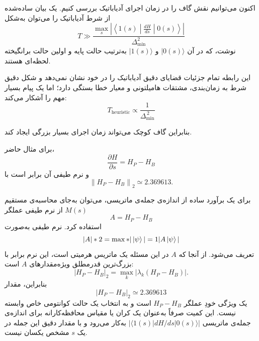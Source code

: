 اکنون می‌توانیم نقش گاف را در زمان اجرای آدیاباتیک بررسی کنیم. یک بیان ساده‌شده از شرط آدیاباتیک را می‌توان به‌شکل
\begin{equation}
	\label{eq:adiabatic-condition-example}
	T
	\gg
	\frac{
		\displaystyle
		\max_s
		\left|
		\left\langle
		1(s)
		\middle|
		\frac{dH}{ds}
		\middle|
		0(s)
		\right\rangle
		\right|
	}{
		\Delta_{\min}^2
	}
\end{equation}
نوشت، که در آن $\lvert0(s)\rangle$ و $\lvert1(s)\rangle$ به‌ترتیب حالت پایه و اولین حالت برانگیخته لحظه‌ای هستند.

این رابطه تمام جزئیات قضایای دقیق آدیاباتیک را در خود نشان نمی‌دهد و شکل دقیق شرط به زمان‌بندی، مشتقات هامیلتونی و معیار خطا بستگی دارد؛ اما یک پیام بسیار مهم را آشکار می‌کند:
\begin{equation}
	\boxed{
		T_{\mathrm{heuristic}}\propto\frac{1}{\Delta_{\min}^{\,2}}
	}
\end{equation}


بنابراین گاف کوچک می‌تواند زمان اجرای بسیار بزرگی ایجاد کند.

برای مثال حاضر،
\begin{equation}
	\frac{\partial H}{\partial s}=H_P-H_B
\end{equation}
و نرم طیفی آن برابر است با
\begin{equation}
	\label{eq:norm-example}
	\left\|H_P-H_B\right\|_2
	\simeq2.369613.
\end{equation}

برای یک برآورد ساده از اندازه‌ی جمله‌ی ماتریسی، می‌توان به‌جای محاسبه‌ی مستقیم $M(s)$ از نرم طیفی عملگر
\begin{equation}
	A=H_P-H_B
\end{equation}
استفاده کرد. نرم طیفی به‌صورت
\begin{equation}
	|A|*2
	=
	\max*{|\ket{\psi}|=1}
	|A\ket{\psi}|
\end{equation}
تعریف می‌شود. از آنجا که $A$ در این مسئله یک ماتریس هرمیتی است، این نرم برابر با بزرگ‌ترین قدرمطلق ویژه‌مقدارهای $A$ است:
\begin{equation}
	|H_P-H_B|_2
	=
	\max_k
	\left|\lambda_k(H_P-H_B)\right|.
\end{equation}
بنابراین، مقدار
\begin{equation}
	|H_P-H_B|_2\simeq2.369613
\end{equation}
یک ویژگی خودِ عملگر $H_P-H_B$ است و به انتخاب یک حالت کوانتومی خاص وابسته نیست. این کمیت صرفاً به‌عنوان یک کران یا مقیاس محافظه‌کارانه برای اندازه‌ی جمله‌ی ماتریسی
$\left|\langle1(s)|dH/ds|0(s)\rangle\right|$
به‌کار می‌رود و با مقدار دقیق این جمله در یک $s$ مشخص یکسان نیست.





